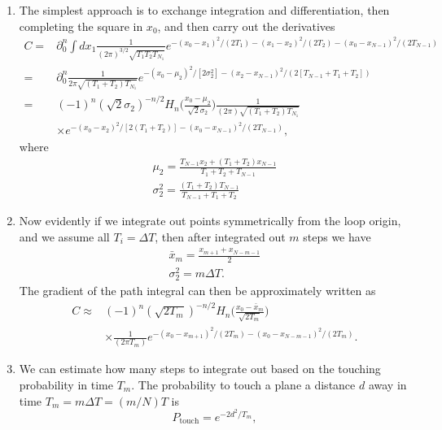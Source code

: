 \begin{enumerate}
    \item The simplest approach is to exchange integration and differentiation, then completing the square in $x_0$,
    and then carry out the derivatives
    \begin{align}
      C=&\partial_0^n\int dx_1  \frac{1}{(2\pi)^{3/2}\sqrt{T_1T_2T_{N_1}}}e^{-(x_0-x_1)^2/(2T_1)-(x_1-x_2)^2/(2T_2)-(x_0-x_{N-1})^2/(2T_{N-1})}\\
      =&\partial_0^n \frac{1}{2\pi\sqrt{(T_1+T_2)T_{N_1}}}e^{-(x_0-\mu_2)^2/[2\sigma_2^2]-(x_2-x_{N-1})^2/(2[T_{N-1}+T_1+T_2])}\\
      =&(-1)^n(\sqrt{2}\sigma_2)^{-n/2}H_n\bigg(\frac{x_0-\mu_2}{\sqrt{2}\sigma_2}\bigg)
      \frac{1}{(2\pi)\sqrt{(T_1+T_2)T_{N_1}}}\nonumber\\
      &\times e^{-(x_0-x_2)^2/[2(T_1+T_2)]-(x_0-x_{N-1})^2/(2T_{N-1})},
    \end{align}
    where 
    \begin{gather}
      \mu_2 = \frac{T_{N-1}x_2+ (T_1+T_2)x_{N-1}}{T_1+T_2+T_{N-1}}\\
      \sigma_2^2 = \frac{(T_1+T_2)T_{N-1}}{T_{N-1}+T_1+T_2}
    \end{gather}
  \item Now evidently if we integrate out points symmetrically from the loop origin, and we 
    assume all $T_i=\Delta T$, then after integrated out $m$ steps we have 
    \begin{gather}
      \bar{x}_m = \frac{x_{m+1}+ x_{N-m-1}}{2}\\
      \sigma_2^2 = m\Delta T.
    \end{gather}
    The gradient of the path integral can then be approximately written as 
    \begin{align}
      C\approx
      &(-1)^n(\sqrt{2 T_m})^{-n/2}H_n\bigg(\frac{x_0-\bar{x}_m}{\sqrt{2 T_m}}\bigg)\nonumber\\
      &\times \frac{1}{(2\pi T_m)}e^{-(x_0-x_{m+1})^2/(2T_m)-(x_0-x_{N-m-1})^2/(2T_m)}.
    \end{align}
  \item We can estimate how many steps to integrate out based on the touching probability in time $T_m$.  
    The probability to touch a plane a distance $d$ away in time $T_m=m\Delta T = (m/N)T$ is 
    \begin{equation}
      P_{\text{touch}} = e^{-2d^2/T_m},
    \end{equation}

\end{enumerate}
